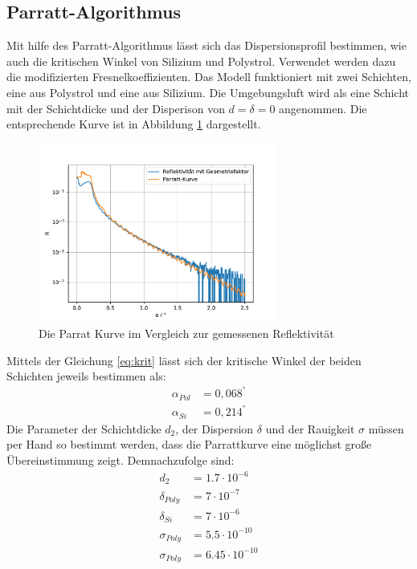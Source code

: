 \subsection{Parratt-Algorithmus}

Mit hilfe des Parratt-Algorithmus lässt sich das Dispersionsprofil bestimmen,
wie auch die kritischen Winkel von Silizium und Polystrol.
Verwendet werden dazu die modifizierten Fresnelkoeffizienten.
Das Modell funktioniert mit zwei Schichten, eine aus Polystrol und eine aus Silizium.
Die Umgebungsluft wird als eine Schicht mit der Schichtdicke und der Disperison von $d = \delta = 0$ angenommen.
Die entsprechende Kurve ist in Abbildung \ref{fig:parratt} dargestellt.
\begin{figure}[h]
    \centering
    \includegraphics[width = 0.7\textwidth]{Auswertung/Graphen/Parrat_Algorthmus.pdf}
    \caption{Die Parrat Kurve im Vergleich zur gemessenen Reflektivität}
    \label{fig:parratt}
\end{figure}
Mittels der Gleichung \eqref{eq:krit} lässt sich der kritische Winkel der beiden Schichten jeweils bestimmen als:
\begin{align}
    \alpha_{Pol} &= 0,068^° \\
    \alpha_{Si}  &= 0,214^°
\end{align}
Die Parameter der Schichtdicke $d_2$, der Dispersion $\delta$ und der Rauigkeit $\sigma$ müssen per Hand so bestimmt werden,
dass die Parrattkurve eine möglichst große Übereinstimmung zeigt.
Demnachzufolge sind:
\begin{align*} 
    d_2 &=  1.7\cdot 10^{-6} \\
    \delta_{Poly} &= 7\cdot 10^{-7} \\
    \delta_{Si} &= 7\cdot 10^{-6} \\
    \sigma_{Poly} &=  5.5\cdot 10^{-10}\\
    \sigma_{Poly} &=  6.45\cdot 10^{-10}
\end{align*}
